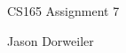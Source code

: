 \documentclass[10pt,a4paper]{report}
\begin{document}
CS165 Assignment 7

Jason Dorweiler\\
\end{document}
